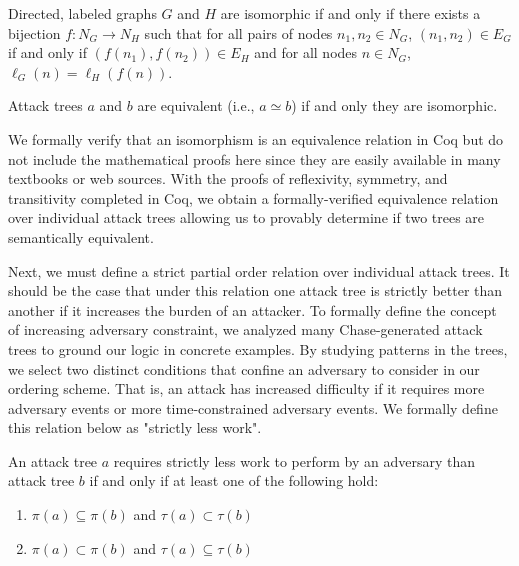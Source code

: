 \documentclass[runningheads]{llncs}
\theoremstyle{definition}
\newcommand{\squash}{\itemsep=0pt\parskip=0pt}
\begin{document}
\begin{definition}[Isomorphism]
    Directed, labeled graphs $G$ and $H$ are isomorphic if and only if there exists a bijection $f : N_G \to N_H$ such that for all pairs of nodes $n_1, n_2 \in N_G$, $(n_1,n_2) \in E_G$ if and only if $(f(n_1),f(n_2)) \in E_H$ and for all nodes $n \in N_G$, $\ell_G(n) = \ell_H(f(n))$.
\end{definition}


\begin{definition}
  Attack trees $a$ and $b$ are equivalent (i.e., $a \simeq b$) if and only they are isomorphic.
\end{definition}


\noindent We formally verify that an isomorphism is an equivalence relation in Coq but do not include the mathematical proofs here since they are easily available in many textbooks or web sources. With the proofs of reflexivity, symmetry, and transitivity completed in Coq, we obtain a formally-verified equivalence relation over individual attack trees allowing us to provably determine if two trees are semantically equivalent.


Next, we must define a strict partial order relation over individual attack trees. It should be the case that under this relation one attack tree is strictly better than another if it increases the burden of an attacker. To formally define the concept of increasing adversary constraint, we analyzed many Chase-generated attack trees to ground our logic in concrete examples. By studying patterns in the trees, we select two distinct conditions that confine an adversary to consider in our ordering scheme. That is, an attack has increased difficulty if it requires more adversary events or more time-constrained adversary events. We formally define this relation below as "strictly less work".

\begin{definition}
  An attack tree $a$ requires strictly less work to perform by an adversary than attack tree $b$ if and only if at least one of the following hold: 
\begin{enumerate}
  \squash
  \item $\pi(a) \subseteq \pi(b)$ and $\tau(a) \subset \tau(b)$
  \item $\pi(a) \subset \pi(b)$ and $\tau(a) \subseteq \tau(b)$
\end{enumerate}
\end{definition}
\end{document}
